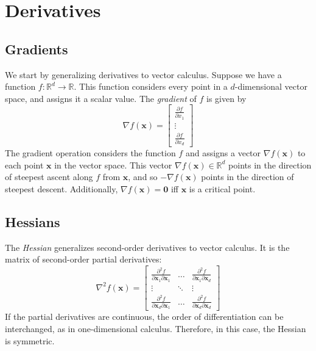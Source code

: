 \documentclass{article}
\begin{document}
\section{Derivatives}

\subsection{Gradients}
We start by generalizing derivatives to vector calculus. Suppose we have a function $f: \mathbb{R}^d \rightarrow \mathbb{R}$. This function considers every point in a $d$-dimensional vector space, and assigns it a scalar value. The \textit{gradient} of $f$ is given by $$\nabla f(\mathbf{x}) = \begin{bmatrix} \frac{\partial f}{\partial x_1} \\ \vdots \\ \frac{\partial f}{\partial x_d} \end{bmatrix}$$ The gradient operation considers the function $f$ and assigns a vector $\nabla f(\mathbf{x})$ to each point $\mathbf{x}$ in the vector space. This vector $\nabla f(\mathbf{x}) \in \mathbb{R}^d$ points in the direction of steepest ascent along $f$ from $\mathbf{x}$, and so $-\nabla f(\mathbf{x})$ points in the direction of steepest descent. Additionally, $\nabla f(\mathbf{x}) = \mathbf{0}$ iff $\mathbf{x}$ is a critical point.

\subsection{Hessians}
The \textit{Hessian} generalizes second-order derivatives to vector calculus. It is the matrix of second-order partial derivatives: $$\nabla^2f(\mathbf{x}) = \begin{bmatrix} \frac{\partial^2f}{\partial \mathbf{x}_1\partial\mathbf{x}_1} & \hdots & \frac{\partial^2f}{\partial\mathbf{x}_1\partial\mathbf{x}_d} \\ \vdots & \ddots & \vdots \\ \frac{\partial^2f}{\partial \mathbf{x}_d\partial\mathbf{x}_1} & \hdots & \frac{\partial^2f}{\partial\mathbf{x}_d\partial\mathbf{x}_d} \end{bmatrix}$$ If the partial derivatives are continuous, the order of differentiation can be interchanged, as in one-dimensional calculus. Therefore, in this case, the Hessian is symmetric.
\end{document}
